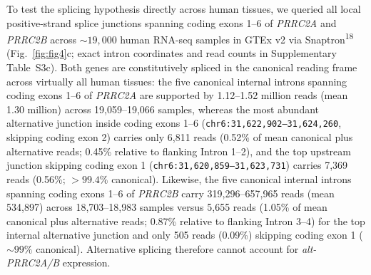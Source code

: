 \documentclass[10pt,letterpaper]{article}
\newcommand{\gene}[1]{\textit{#1}}
\newcommand{\refsup}[1]{\textsuperscript{#1}}
\begin{document}
To test the splicing hypothesis directly across human tissues, we queried all local positive-strand splice junctions spanning coding exons 1--6 of \gene{PRRC2A} and \gene{PRRC2B} across $\sim 19,000$ human RNA-seq samples in GTEx v2 via Snaptron\refsup{18} (Fig.~\ref{fig:fig4}c; exact intron coordinates and read counts in Supplementary Table~S3c). Both genes are constitutively spliced in the canonical reading frame across virtually all human tissues: the five canonical internal introns spanning coding exons 1--6 of \gene{PRRC2A} are supported by 1.12--1.52 million reads (mean 1.30 million) across 19,059--19,066 samples, whereas the most abundant alternative junction inside coding exons 1--6 (\texttt{chr6:31,622,902--31,624,260}, skipping coding exon 2) carries only 6,811 reads (0.52\% of mean canonical plus alternative reads; 0.45\% relative to flanking Intron 1--2), and the top upstream junction skipping coding exon 1 (\texttt{chr6:31,620,859--31,623,731}) carries 7,369 reads (0.56\%; $> 99.4\%$ canonical). Likewise, the five canonical internal introns spanning coding exons 1--6 of \gene{PRRC2B} carry 319,296--657,965 reads (mean 534,897) across 18,703--18,983 samples versus 5,655 reads (1.05\% of mean canonical plus alternative reads; 0.87\% relative to flanking Intron 3--4) for the top internal alternative junction and only 505 reads (0.09\%) skipping coding exon 1 ($\sim 99\%$ canonical). Alternative splicing therefore cannot account for \gene{alt-PRRC2A/B} expression.
\end{document}
